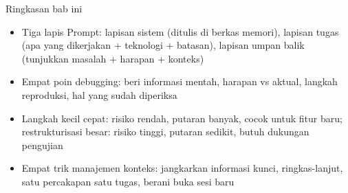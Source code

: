 \begin{tcbsummary}{Ringkasan bab ini}
\begin{itemize}
  \item Tiga lapis Prompt: lapisan sistem (ditulis di berkas memori), lapisan tugas (apa yang dikerjakan + teknologi + batasan), lapisan umpan balik (tunjukkan masalah + harapan + konteks)
  \item Empat poin debugging: beri informasi mentah, harapan vs aktual, langkah reproduksi, hal yang sudah diperiksa
  \item Langkah kecil cepat: risiko rendah, putaran banyak, cocok untuk fitur baru; restrukturisasi besar: risiko tinggi, putaran sedikit, butuh dukungan pengujian
  \item Empat trik manajemen konteks: jangkarkan informasi kunci, ringkas-lanjut, satu percakapan satu tugas, berani buka sesi baru
\end{itemize}

\end{tcbsummary}
